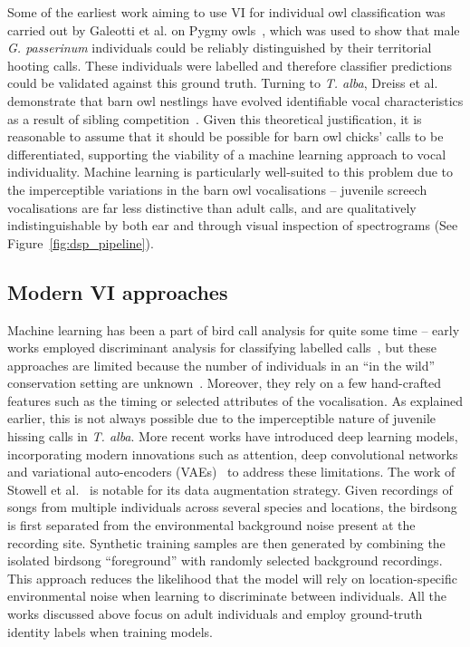 Some of the earliest work aiming to use VI for individual owl classification was carried out by Galeotti et al. on Pygmy owls~\cite{galeottiIndividuallyDistinctHooting1993}, which was used to show that male \textit{G. passerinum} individuals could be reliably distinguished by their territorial hooting calls. These individuals were labelled and therefore classifier predictions could be validated against this ground truth. Turning to \textit{T. alba}, Dreiss et al. demonstrate that barn owl nestlings have evolved identifiable vocal characteristics as a result of sibling competition~\cite{dreissIndividualVocalSignatures2014}. Given this theoretical justification, it is reasonable to assume that it should be possible for barn owl chicks' calls to be differentiated, supporting the viability of a machine learning approach to vocal individuality. Machine learning is particularly well-suited to this problem due to the imperceptible variations in the barn owl vocalisations -- juvenile screech vocalisations are far less distinctive than adult calls, and are qualitatively indistinguishable by both ear and through visual inspection of spectrograms (See Figure~\ref{fig:dsp_pipeline}). 

\subsection{Modern VI approaches}
Machine learning has been a part of bird call analysis for quite some time -- early works employed discriminant analysis for classifying labelled calls~\cite{galeottiIndividuallyDistinctHooting1993,lengagneTEMPORALSTABILITYINDIVIDUAL2001,delportVocalIdentificationIndividual2002,gravaIndividualAcousticMonitoring2008,pamelaIDENTIFICATIONINDIVIDUALBARRED2008,yeeVocalIndividualitySunda2016}, but these approaches are limited because the number of individuals in an ``in the wild'' conservation setting are unknown~\cite{nagyIdentificationIndividualEastern2012}. Moreover, they rely on a few hand-crafted features such as the timing or selected attributes of the vocalisation. As explained earlier, this is not always possible due to the imperceptible nature of juvenile hissing calls in \textit{T. alba}. More recent works have introduced deep learning models, incorporating modern innovations such as attention, deep convolutional networks and variational auto-encoders (VAEs)~\cite{ntalampirasAcousticDetectionUnknown2021,xieHighAccuracyIndividual2020,bedoyaAcousticCensusingIndividual2021} to address these limitations. The work of Stowell et al.~\cite{stowellAutomaticAcousticIdentification2018} is notable for its data augmentation strategy. Given recordings of songs from multiple individuals across several species and locations, the birdsong is first separated from the environmental background noise present at the recording site. Synthetic training samples are then generated by combining the isolated birdsong ``foreground'' with randomly selected background recordings. This approach reduces the likelihood that the model will rely on location-specific environmental noise when learning to discriminate between individuals. All the works discussed above focus on adult individuals and employ ground-truth identity labels when training models. 

